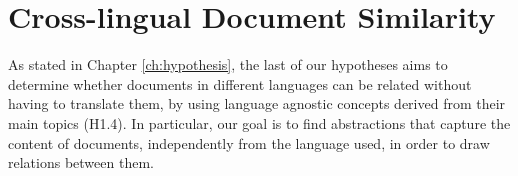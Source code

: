 

\chapter{Cross-lingual Document Similarity}\label{ch:multilinguality}

\graphicspath{{multilinguality/figures/}}



As stated in Chapter \ref{ch:hypothesis}, the last of our hypotheses aims to determine whether documents in different languages can be related without having to translate them, by using language agnostic concepts derived from their main topics (H1.4). In particular, our goal is to find abstractions that capture the content of documents, independently from the language used, in order to draw relations between them. 

